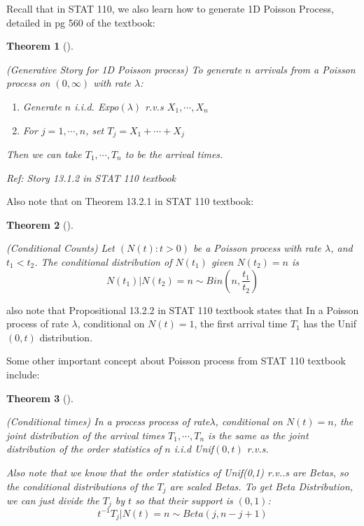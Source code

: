 \documentclass[
  letterpaper,
  DIV=11,
  numbers=noendperiod]{scrreprt}
\theoremstyle{definition}
\theoremstyle{plain}
\newtheorem{theorem}{Theorem}[chapter]
\theoremstyle{remark}
\begin{document}
Recall that in STAT 110, we also learn how to generate 1D Poisson
Process, detailed in pg 560 of the textbook:

\leavevmode{}%
\begin{theorem}[]\label{thm-poisson-story}

(Generative Story for 1D Poisson process) To generate \(n\) arrivals
from a Poisson process on \((0, \infty)\) with rate \(\lambda\):

\begin{enumerate}
\def\labelenumi{\arabic{enumi}.}
\item
  Generate \(n\) i.i.d. Expo\((\lambda)\) r.v.s \(X_1, \cdots, X_n\)
\item
  For \(j=1, \cdots, n\), set \(T_j = X_1 + \cdots+X_j\)
\end{enumerate}

Then we can take \(T_1, \cdots, T_n\) to be the arrival times.

\emph{Ref: Story 13.1.2 in STAT 110 textbook}

\end{theorem}

Also note that on Theorem 13.2.1 in STAT 110 textbook:

\leavevmode{}%
\begin{theorem}[]\label{thm-conditional-counts}

(Conditional Counts) Let \((N(t):t>0)\) be a Poisson process with rate
\(\lambda\), and \(t_1<t_2\). The conditional distribution of \(N(t_1)\)
given \(N(t_2) = n\) is
\[N(t_1)|N(t_2)=n \sim Bin \left(n, \frac{t_1}{t_2}\right)\]

\end{theorem}

also note that Propositional 13.2.2 in STAT 110 textbook states that In
a Poisson process of rate \(\lambda\), conditional on \(N(t) =1\), the
first arrival time \(T_1\) has the Unif\((0,t)\) distribution.

Some other important concept about Poisson process from STAT 110
textbook include:

\leavevmode{}%
\begin{theorem}[]\label{thm-conditional-time}

(Conditional times) In a process process of rate\(\lambda\), conditional
on \(N(t)=n\), the joint distribution of the arrival times
\(T_1, \cdots, T_n\) is the same as the joint distribution of the order
statistics of \(n\) i.i.d Unif\((0,t)\) r.v.s.

Also note that we know that the order statistics of Unif(0,1) r.v..s are
Betas, so the conditional distributions of the \(T_j\) are \emph{scaled}
Betas. To get Beta Distribution, we can just divide the \(T_j\) by \(t\)
so that their support is \((0,1)\):
\[t^{-1}T_j | N(t) = n \sim Beta(j, n-j+1)\]

\end{theorem}
\end{document}
